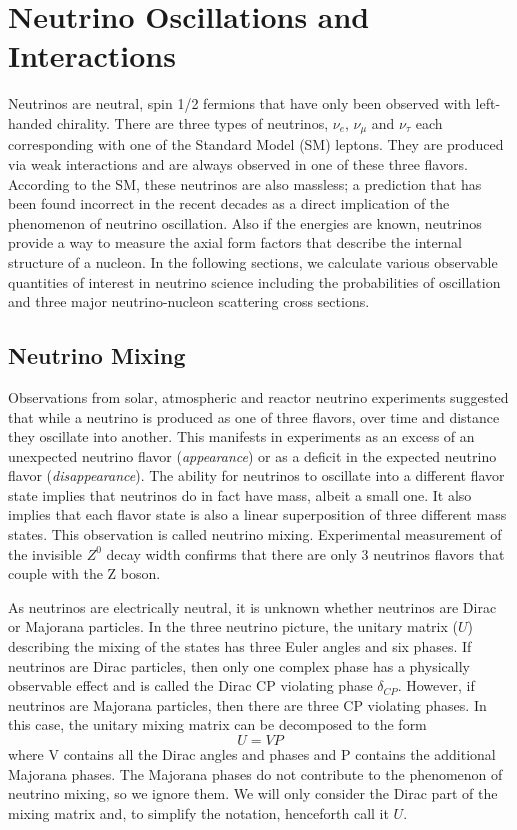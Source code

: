 \section{Neutrino Oscillations and Interactions}
\label{sec:Theory}

Neutrinos are neutral, spin 1/2 fermions that have only been observed with left-handed chirality. There are three types of neutrinos, $\nu_e$, $\nu_\mu$ and $\nu_\tau$ each corresponding with one of the Standard Model (SM) leptons. They are produced via weak interactions and are always observed in one of these three flavors. According to the SM, these neutrinos are also massless; a prediction that has been found incorrect in the recent decades as a direct implication of the phenomenon of neutrino oscillation. Also if the energies are known, neutrinos provide a way to measure the axial form factors that describe the internal structure of a nucleon. In the following sections, we calculate various observable quantities of interest in neutrino science including the probabilities of oscillation and three major neutrino-nucleon scattering cross sections.

\subsection{Neutrino Mixing}
\label{sec:neutosc}

Observations from solar, atmospheric and reactor neutrino experiments suggested that while a neutrino is produced as one of three flavors, over time and distance they oscillate into another. This manifests in experiments as an excess of an unexpected neutrino flavor (\emph{appearance}) or as a deficit in the expected neutrino flavor (\emph{disappearance}). The ability for neutrinos to oscillate into a different flavor state implies that neutrinos do in fact have mass, albeit a small one. It also implies that each flavor state is also a linear superposition of three different mass states. This observation is called neutrino mixing. Experimental measurement of the invisible $Z^0$ decay width confirms that there are only 3 neutrinos flavors that couple with the Z boson.

As neutrinos are electrically neutral, it is unknown whether neutrinos are Dirac or Majorana particles. In the three neutrino picture, the unitary matrix ($U$) describing the mixing of the states has three Euler angles and six phases. If neutrinos are Dirac particles, then only one complex phase has a physically observable effect and is called the Dirac CP violating phase $\delta_{CP}$. However, if neutrinos are Majorana particles, then there are three CP violating phases. In this case, the unitary mixing matrix can be decomposed to the form
\begin{equation}
U = V P
\end{equation}
where V contains all the Dirac angles and phases and P contains the additional Majorana phases. The Majorana phases do not contribute to the phenomenon of neutrino mixing, so we ignore them. We will only consider the Dirac part of the mixing matrix and, to simplify the notation, henceforth call it $U$.

